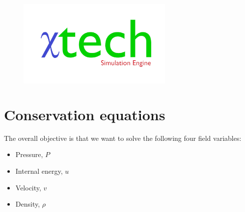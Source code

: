 \documentclass[11pt,letterpaper,titlepage]{article}
\begin{document}
\begin{titlepage}
\begin{center}
\begin{minipage}[c]{0.45\textwidth}
\begin{figure}[H]
				\includegraphics[width=3in]{Logo2_Medium.png}
			\end{figure}
		\end{minipage}
	\end{center}
	\vspace{2cm}
\end{titlepage}


\pagestyle{fancy}
\cfoot{}
\lfoot{\truncate{14cm}{\NSCDOCTITLE}}
\rhead{}
\chead{\currentname}
\lhead{}
\renewcommand{\footrulewidth}{0.4pt}
\tableofcontents
{}

\listoffigures
{}


\newpage
{}
\section{Conservation equations}
The overall objective is that we want to solve the following four field variables:
\begin{itemize}
\item Pressure, $P$
\item Internal energy, $u$
\item Velocity, $v$
\item Density, $\rho$
\end{itemize}
\end{document}
